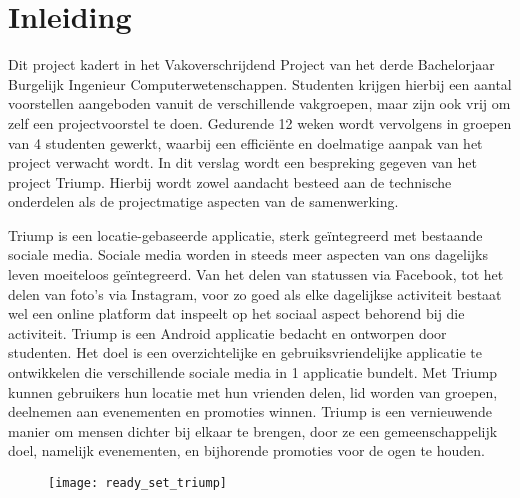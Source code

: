 \chapter{Inleiding}
Dit project kadert in het Vakoverschrijdend Project van het derde Bachelorjaar Burgelijk Ingenieur Computerwetenschappen. Studenten krijgen hierbij een aantal voorstellen aangeboden vanuit de verschillende vakgroepen, maar zijn ook vrij om zelf een projectvoorstel te doen. Gedurende 12 weken wordt vervolgens in groepen van 4 studenten gewerkt, waarbij een efficiënte en doelmatige aanpak van het project verwacht wordt. In dit verslag wordt een bespreking gegeven van het project Triump. Hierbij wordt zowel aandacht besteed aan de technische onderdelen als de projectmatige aspecten van de samenwerking.


Triump is een locatie-gebaseerde applicatie, sterk geïntegreerd met bestaande sociale media.
Sociale media worden in steeds meer aspecten van ons dagelijks leven moeiteloos geïntegreerd. Van het delen van statussen via Facebook, tot het delen van foto’s via Instagram, voor zo goed als elke dagelijkse activiteit bestaat wel een online platform dat inspeelt op het sociaal aspect behorend bij die activiteit.
Triump is een Android applicatie bedacht en ontworpen door studenten. Het doel is een overzichtelijke en gebruiksvriendelijke applicatie te ontwikkelen die verschillende sociale media in 1 applicatie bundelt. 
Met Triump kunnen gebruikers hun locatie met hun vrienden delen, lid worden van groepen, deelnemen aan evenementen en promoties winnen.
Triump is een vernieuwende manier om mensen dichter bij elkaar te brengen, door ze een gemeenschappelijk doel, namelijk evenementen, en bijhorende promoties voor de ogen te houden.

\begin{figure}[H]
	\centering
	\texttt{[image: ready\_set\_triump]}
	\label{fig:inleiding}
	
\end{figure}
